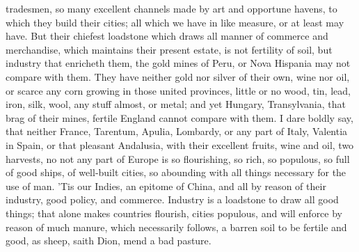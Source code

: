 {tradesmen, so many excellent channels made by art and opportune havens,
to which they build their cities; all which we have in like measure, or
at least may have. But their chiefest loadstone which draws all manner
of commerce and merchandise, which maintains their present estate, is
not fertility of soil, but industry that enricheth them, the gold mines
of Peru, or Nova Hispania may not compare with them. They have neither
gold nor silver of their own, wine nor oil, or scarce any corn growing
in those united provinces, little or no wood, tin, lead, iron, silk,
wool, any stuff almost, or metal; and yet Hungary, Transylvania, that
brag of their mines, fertile England cannot compare with them. I dare
boldly say, that neither France, Tarentum, Apulia, Lombardy, or any
part of Italy, Valentia in Spain, or that pleasant Andalusia, with
their excellent fruits, wine and oil, two harvests, no not any part of
Europe is so flourishing, so rich, so populous, so full of good ships,
of well-built cities, so abounding with all things necessary for the
use of man. 'Tis our Indies, an epitome of China, and all by reason of
their industry, good policy, and commerce. Industry is a loadstone to
draw all good things; that alone makes countries flourish, cities
populous, and will enforce by reason of much manure, which
necessarily follows, a barren soil to be fertile and good, as sheep,
saith Dion, mend a bad pasture.

}
